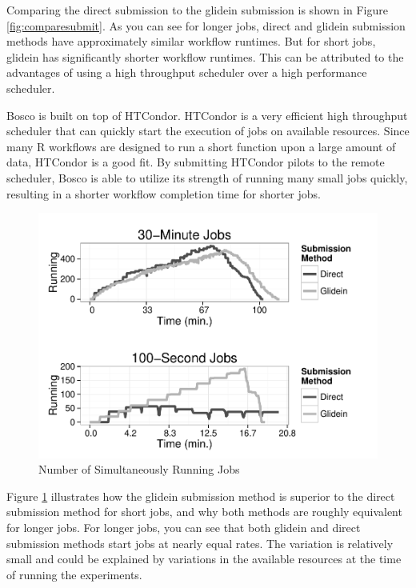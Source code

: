 Comparing the direct submission to the glidein submission is shown in Figure \ref{fig:comparesubmit}.  As you can see for longer jobs, direct and glidein submission methods have approximately similar workflow runtimes.  But for short jobs, glidein has significantly shorter workflow runtimes.  This can be attributed to the advantages of using a high throughput scheduler over a high performance scheduler.

Bosco is built on top of HTCondor.  HTCondor is a very efficient high throughput scheduler that can quickly start the execution of jobs on available resources.  Since many R workflows are designed to run a short function upon a large amount of data, HTCondor is a good fit.  By submitting HTCondor pilots to the remote scheduler, Bosco is able to utilize its strength of running many small jobs quickly, resulting in a shorter workflow completion time for shorter jobs.

\begin{figure}[h!t]
\centering
\includegraphics[width=\textwidth]{BoscoRImages/NumberRunning-color.pdf}

\caption{Number of Simultaneously Running Jobs}
\label{fig:runningjobs}
\end{figure}

Figure \ref{fig:runningjobs} illustrates how the glidein submission method is superior to the direct submission method for short jobs, and why both methods are roughly equivalent for longer jobs.  For longer jobs, you can see that both glidein and direct submission methods start jobs at nearly equal rates.  The variation is relatively small and could be explained by variations in the available resources at the time of running the experiments. 

